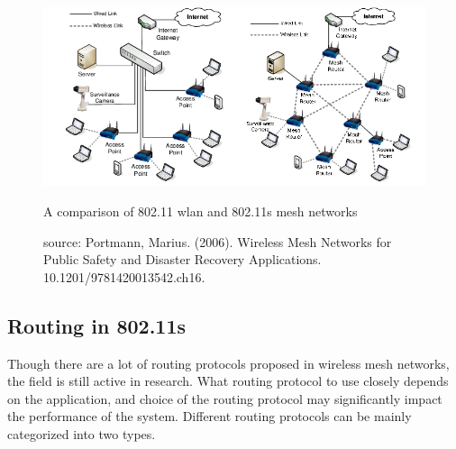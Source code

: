 \begin{figure}
	\centering
	\includegraphics[scale=0.6]{Pictures/80211s.png}
	\caption{A comparison of 802.11 wlan and 802.11s mesh networks}
	\label{fig: 802.11s}
	\caption*{source: Portmann, Marius. (2006). Wireless Mesh Networks for Public Safety and Disaster Recovery Applications. 10.1201/9781420013542.ch16. }
\end{figure}

\subsection{Routing in 802.11s}
Though there are a lot of routing protocols proposed in wireless mesh networks, the field is still active in research. What routing protocol to use closely depends on the application, and choice of the routing protocol may significantly impact the performance of the system. Different routing protocols can be mainly categorized into two types.

